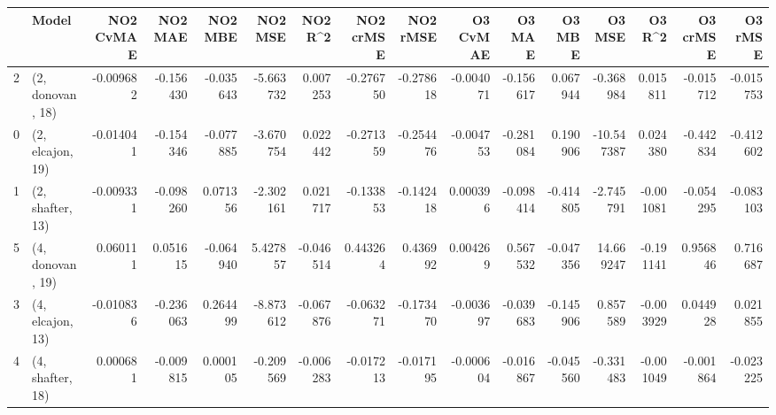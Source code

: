 \begin{tabular}{llrrrrrrrrrrrrrr}
\toprule
{} &             Model &  NO2 CvMAE &   NO2 MAE &   NO2 MBE &   NO2 MSE &   NO2 R\textasciicircum2 &  NO2 crMSE &  NO2 rMSE &  O3 CvMAE &    O3 MAE &    O3 MBE &     O3 MSE &    O3 R\textasciicircum2 &  O3 crMSE &   O3 rMSE \\
\midrule
2 &  (2, donovan, 18) &  -0.009682 & -0.156430 & -0.035643 & -5.663732 &  0.007253 &  -0.276750 & -0.278618 & -0.004071 & -0.156617 &  0.067944 &  -0.368984 &  0.015811 & -0.015712 & -0.015753 \\
0 &  (2, elcajon, 19) &  -0.014041 & -0.154346 & -0.077885 & -3.670754 &  0.022442 &  -0.271359 & -0.254476 & -0.004753 & -0.281084 &  0.190906 & -10.547387 &  0.024380 & -0.442834 & -0.412602 \\
1 &  (2, shafter, 13) &  -0.009331 & -0.098260 &  0.071356 & -2.302161 &  0.021717 &  -0.133853 & -0.142418 &  0.000396 & -0.098414 & -0.414805 &  -2.745791 & -0.001081 & -0.054295 & -0.083103 \\
5 &  (4, donovan, 19) &   0.060111 &  0.051615 & -0.064940 &  5.427857 & -0.046514 &   0.443264 &  0.436992 &  0.004269 &  0.567532 & -0.047356 &  14.669247 & -0.191141 &  0.956846 &  0.716687 \\
3 &  (4, elcajon, 13) &  -0.010836 & -0.236063 &  0.264499 & -8.873612 & -0.067876 &  -0.063271 & -0.173470 & -0.003697 & -0.039683 & -0.145906 &   0.857589 & -0.003929 &  0.044928 &  0.021855 \\
4 &  (4, shafter, 18) &   0.000681 & -0.009815 &  0.000105 & -0.209569 & -0.006283 &  -0.017213 & -0.017195 & -0.000604 & -0.016867 & -0.045560 &  -0.331483 & -0.001049 & -0.001864 & -0.023225 \\
\bottomrule
\end{tabular}

